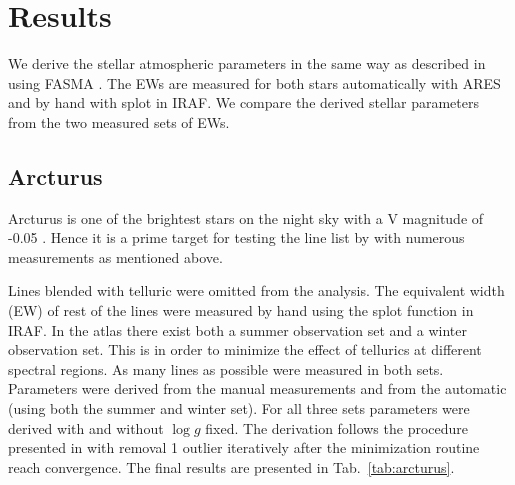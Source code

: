 \documentclass{aa}
\begin{document}
\section{Results}
\label{sec:results}

We derive the stellar atmospheric parameters in the same way as described in
\citet{Andreasen2016} using FASMA \citep{Andreasen2017a}. The EWs are measured
for both stars automatically with ARES \citep{Sousa2015a} and by hand with splot
in IRAF. We compare the derived stellar parameters from the two measured sets of
EWs.


\subsection{Arcturus}
\label{sec:arcturus}

Arcturus is one of the brightest stars on the night sky with a V magnitude of
-0.05 \citep{Ducati2002}. Hence it is a prime target for testing the line list
by \cite{Andreasen2016} with numerous measurements as mentioned above.

Lines blended with telluric were omitted from the analysis. The equivalent width
(EW) of rest of the lines were measured by hand using the splot function in
IRAF. In the atlas there exist both a summer observation set and a winter
observation set. This is in order to minimize the effect of tellurics at
different spectral regions. As many lines as possible were measured in both
sets. Parameters were derived from the manual measurements and from the
automatic (using both the summer and winter set). For all three sets parameters
were derived with and without $\log g$ fixed. The derivation follows the
procedure presented in \citet{Andreasen2016} with removal 1 outlier iteratively
after the minimization routine \citep{Andreasen2017a} reach convergence. The
final results are presented in Tab.~\ref{tab:arcturus}.
\end{document}
